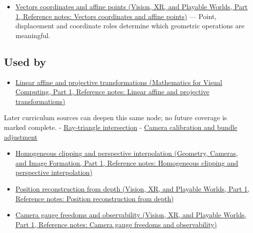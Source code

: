 \begin{itemize}
\tightlist
\item
  \href{../07-Vision-XR-and-Playable-Worlds-P01/main.pdf\#nameddest=appendix-0659864c0aa3}{Vectors coordinates and affine points (Vision, XR, and Playable Worlds, Part 1, Reference notes: Vectors coordinates and affine points)} --- Point, displacement and coordinate roles determine which geometric operations are meaningful.
\end{itemize}

\subsection{Used by}\label{appendix-cb3b26862282-used-by}

\hypertarget{appendix-cb3b26862282-used-by}{}

\begin{itemize}
\tightlist
\item
  \href{../02-Mathematics-for-Visual-Computing-P01/main.pdf\#nameddest=appendix-0bf0ca73f735}{Linear affine and projective transformations (Mathematics for Visual Computing, Part 1, Reference notes: Linear affine and projective transformations)}
\end{itemize}

Later curriculum sources can deepen this same node; no future coverage is marked complete. - \hyperref[appendix-47ac1bd6d144]{Ray-triangle intersection} - \hyperref[appendix-3ee9861904d5]{Camera calibration and bundle adjustment}

\begin{itemize}
\tightlist
\item
  \href{../03-Geometry-Cameras-and-Image-Formation-P01/main.pdf\#nameddest=appendix-40426e4b2103}{Homogeneous clipping and perspective interpolation (Geometry, Cameras, and Image Formation, Part 1, Reference notes: Homogeneous clipping and perspective interpolation)}
\item
  \href{../07-Vision-XR-and-Playable-Worlds-P01/main.pdf\#nameddest=appendix-2cbf2968e866}{Position reconstruction from depth (Vision, XR, and Playable Worlds, Part 1, Reference notes: Position reconstruction from depth)}
\item
  \href{../07-Vision-XR-and-Playable-Worlds-P01/main.pdf\#nameddest=appendix-113f0267e5f4}{Camera gauge freedoms and observability (Vision, XR, and Playable Worlds, Part 1, Reference notes: Camera gauge freedoms and observability)}
\end{itemize}

